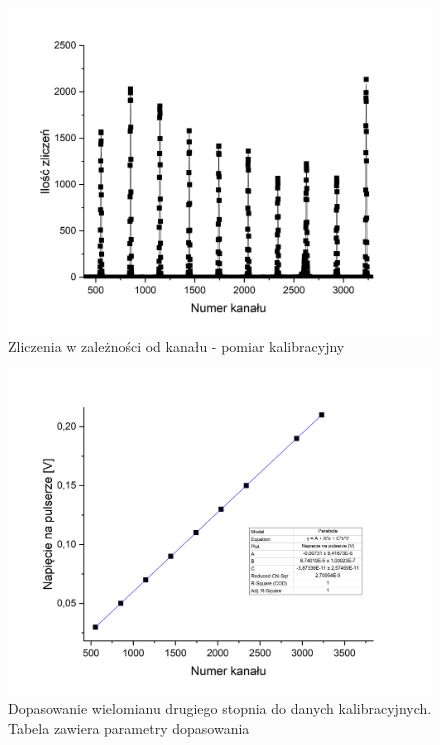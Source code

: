 \documentclass[12pt,a4paper]{article}
\begin{document}
\begin{figure}[H]
\centering
\includegraphics[scale=0.5]{kalibracja.png}
\caption{Zliczenia w zależności od kanału - pomiar kalibracyjny}
\label{kalibracja}
\end{figure}

\begin{figure}[H]
\centering
\includegraphics[scale=0.5]{dopasowanie.png}
\caption{Dopasowanie wielomianu drugiego stopnia do danych kalibracyjnych. Tabela zawiera parametry dopasowania}
\label{dopasowanie_prostej}
\end{figure}
\end{document}
